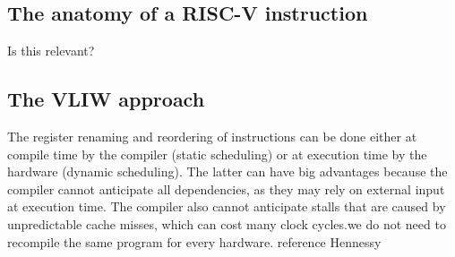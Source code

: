 \documentclass[12pt,a4paper]{article}
\newcommand{\note}{\textcolor{WildStrawberry}}
\begin{document}
\subsection{The anatomy of a RISC-V instruction}
\note{Is this relevant?}

\subsection{The VLIW approach}              
The register renaming and reordering of instructions can be done either at compile time by the compiler (static scheduling) or at execution time by the hardware (dynamic scheduling). The latter can have big advantages because the compiler cannot anticipate all dependencies, as they may rely on external input at execution time. The compiler also cannot anticipate stalls that are caused by unpredictable cache misses, which can cost many clock cycles.\note{we do not need to recompile the same program for every hardware. reference Hennessy}\\
\end{document}
